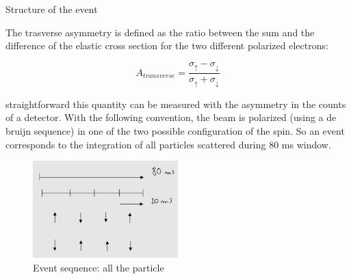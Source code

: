 \documentclass[8pt,a4paper]{beamer}
\begin{document}
\begin{frame}{Structure of the event}

The trasverse asymmetry is defined as the ratio between the sum and the difference of the elastic cross section for the two different polarized electrons: 

\begin{equation*}
A_{transverse} = \dfrac{\sigma_{\uparrow} -  \sigma_{\downarrow}}{\sigma_{\uparrow} + \sigma_{\downarrow}}
\end{equation*}

straightforward this quantity can be measured with the asymmetry in the counts of a detector. With the following convention, the beam is polarized (using a de bruijn sequence) in one of the two possible configuration of the spin. So an event corresponds to the integration of all particles scattered during 80 ms window. 

\begin{figure}[hbtp]
\centering
\includegraphics[width = 0.5\textwidth]{figures/EventStructure.jpg}
\caption{Event sequence: all the particle}
\end{figure}


\end{frame}
\end{document}
